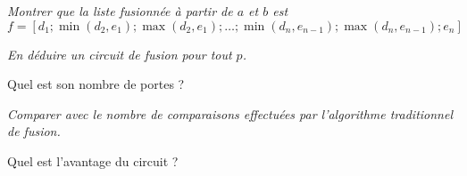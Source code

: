 \begin{Exercise}\it
Montrer que la liste fusionnée \`a partir de $a$ et $b$ est
\[ f = \left[ d_1 ; \min(d_2, e_1) ; \max(d_2,e_1) ; \ldots ; \min(d_n,e_{n-1}) ; \max(d_n,e_{n-1}) ; e_n \right]\]
\end{Exercise}  
\begin{Answer}
\end{Answer}
\begin{Exercise}\it
En déduire un circuit de fusion pour tout $p$. 

Quel est son nombre de portes ?
\end{Exercise}  
\begin{Answer}
\end{Answer}
\begin{Exercise}\it
Comparer avec le nombre de comparaisons effectuées par l'algorithme traditionnel de fusion. 

Quel est l'avantage du circuit ?
\end{Exercise}  
\begin{Answer}
\end{Answer}

